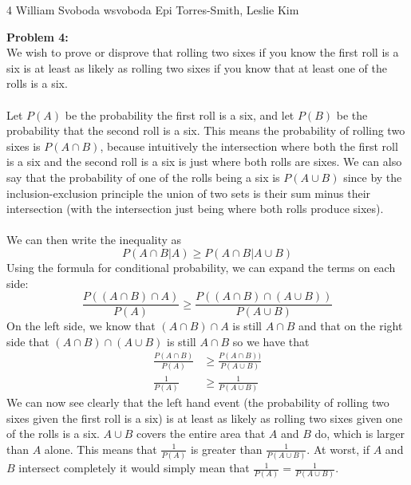 \documentclass[12pt,letterpaper]{cos340hw}
\begin{document}
           {4}            %
           {William Svoboda}  %
           {wsvoboda}   %
           {Epi Torres-Smith, Leslie Kim} 




\noindent\textbf{Problem 4:}\\
We wish to prove or disprove that rolling two sixes if you know the first roll is a six is at least as likely as 
rolling two sixes if you know that at least one of the rolls is a six.\\\\
Let $P(A)$ be the probability the first roll is a six, and let $P(B)$ be the probability that the second roll is 
a six. This means the probability of rolling two sixes is $P(A\cap B)$, because intuitively the intersection 
where both the first roll is a six and the second roll is a six is just where both rolls are sixes. We can also 
say that the probability of one of the rolls being a six is $P(A \cup B)$ since by the inclusion-exclusion 
principle the union of two sets is their sum minus their intersection (with the intersection just being where both 
rolls produce sixes).\\\\
We can then write the inequality as
$$P(A\cap B|A)\ge P(A\cap B|A \cup B)$$
Using the formula for conditional probability, we can expand the terms on each side:
$$\frac{P((A\cap B)\cap A)}{P(A)}\ge\frac{P((A\cap B)\cap (A\cup B))}{P(A\cup B)}$$
On the left side, we know that $(A\cap B)\cap A$ is still $A\cap B$ and that on the right side that 
$(A\cap B)\cap (A\cup B)$ is still $A\cap B$ so we have that
\begin{align*}
\frac{P(A\cap B)}{P(A)} & \ge\frac{P(A\cap B))}{P(A\cup B)}\\
\frac{1}{P(A)} & \ge\frac{1}{P(A\cup B)}
\end{align*}
We can now see clearly that the left hand event (the probability of rolling two sixes given the first roll is 
a six) is at least as likely as rolling two sixes given one of the rolls is a six. $A\cup B$ covers the entire 
area that $A$ and $B$ do, which is larger than $A$ alone. This means that $\frac{1}{P(A)}$ is greater 
than $\frac{1}{P(A\cup B)}$. At worst, if $A$ and $B$ intersect completely it would simply mean that 
$\frac{1}{P(A)}=\frac{1}{P(A\cup B)}$.

\end{document}
